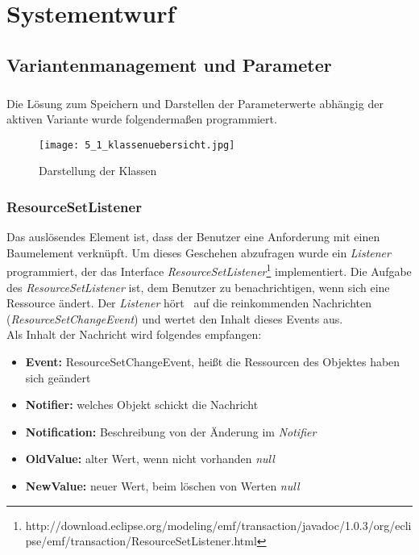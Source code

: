 \chapter{Systementwurf}\label{chp:systementwurf}


\section{Variantenmanagement und Parameter}
\paragraph{}

Die Lösung zum Speichern und Darstellen der Parameterwerte abhängig der aktiven Variante wurde folgendermaßen programmiert.\\

\begin{figure}[h!]
  \begin{center}
    \texttt{[image: 5\_1\_klassenuebersicht.jpg]}
  		  \caption{Darstellung der Klassen}
     \label{ttn.verbindung.klassen.loesung}
  \end{center}
\end{figure}



\subsection{ResourceSetListener}
Das auslösendes Element ist, dass der Benutzer eine Anforderung mit einen Baumelement verknüpft. Um dieses Geschehen abzufragen wurde ein \textit{Listener} programmiert, der das Interface \textit{ResourceSetListener}\footnote{http://download.eclipse.org/modeling/emf/transaction/javadoc/1.0.3/org/eclipse/emf/transaction/ResourceSetListener.html} implementiert. Die Aufgabe des \textit{ResourceSetListener} ist, dem Benutzer zu benachrichtigen, wenn sich eine Ressource ändert. Der \textit{Listener}  \glqq hört\grqq~ auf die reinkommenden Nachrichten (\textit{ResourceSetChangeEvent}) und wertet den Inhalt dieses Events aus.\\

Als Inhalt der Nachricht wird folgendes empfangen: 

\begin{itemize}
\item \textbf{Event: }ResourceSetChangeEvent, heißt die Ressourcen des Objektes haben sich geändert
\item \textbf{Notifier: } welches Objekt schickt die Nachricht
\item \textbf{Notification: }Beschreibung von der Änderung im \textit{Notifier}
\item \textbf{OldValue: } alter Wert, wenn nicht vorhanden \textit{null}
\item \textbf{NewValue: } neuer Wert, beim löschen von Werten \textit{null}
\end{itemize}

